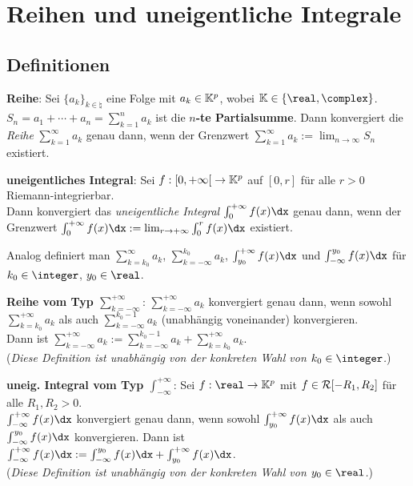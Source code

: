 \chapter{%
    Reihen und uneigentliche Integrale%
}

\section{%
    Definitionen%
}

\textbf{Reihe}:
Sei $\{a_k\}_{k \in \natural}$ eine Folge mit $a_k \in \mathbb{K}^p$, wobei
$\field \in \{\real, \complex\}$.
$S_n = a_1 + \dotsb + a_n = \sum_{k=1}^n a_k$ ist die
\textbf{$n$-te Partialsumme}.
Dann konvergiert die \emph{Reihe} $\sum_{k=1}^\infty a_k$ genau dann, wenn
der Grenzwert $\sum_{k=1}^\infty a_k := \lim_{n \to \infty} S_n$ existiert.

\textbf{uneigentliches Integral}:
Sei $f: \left[0, +\infty\right[ \rightarrow \mathbb{K}^p$ auf $[0, r]$
für alle $r > 0$ Riemann-integrierbar. \\
Dann konvergiert das \emph{uneigentliche Integral} $\int_0^{+\infty} f(x)\dx$
genau dann, wenn der Grenzwert
$\int_0^{+\infty} f(x)\dx := \lim_{r \to +\infty} \int_0^r f(x)\dx$ existiert.

Analog definiert man $\sum_{k=k_0}^\infty a_k$, $\sum_{k=-\infty}^{k_0} a_k$,
$\int_{y_0}^{+\infty} f(x)\dx$ und $\int_{-\infty}^{y_0} f(x)\dx$
für $k_0 \in \integer$, $y_0 \in \real$.

\linie

\textbf{Reihe vom Typ $\sum_{k=-\infty}^{+\infty}$}:
$\sum_{k=-\infty}^{+\infty} a_k$ konvergiert genau dann, wenn sowohl
$\sum_{k=k_0}^{+\infty} a_k$ als auch $\sum_{k=-\infty}^{k_0-1} a_k$
(unabhängig voneinander) konvergieren. \\
Dann ist $\sum_{k=-\infty}^{+\infty} a_k := \sum_{k=-\infty}^{k_0-1} a_k +
\sum_{k=k_0}^{+\infty} a_k$. \\
(\emph{Diese Definition ist unabhängig von der konkreten Wahl von
$k_0 \in \integer$.})

\textbf{uneig. Integral vom Typ $\int_{-\infty}^{+\infty}$}:
Sei $f: \real \rightarrow \field^p$ mit $f \in \mathcal{R}[-R_1, R_2]$ für
alle $R_1, R_2 > 0$. \\
$\int_{-\infty}^{+\infty} f(x)\dx$ konvergiert
genau dann, wenn sowohl $\int_{y_0}^{+\infty} f(x)\dx$ als auch
$\int_{-\infty}^{y_0} f(x)\dx$ konvergieren.
Dann ist $\int_{-\infty}^{+\infty} f(x)\dx :=
\int_{-\infty}^{y_0} f(x)\dx + \int_{y_0}^{+\infty} f(x)\dx$. \\
(\emph{Diese Definition ist unabhängig von der konkreten Wahl von
$y_0 \in \real$.})


